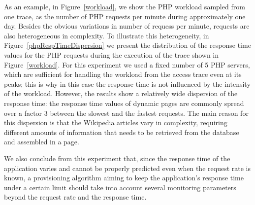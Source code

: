 As an example, in Figure~\ref{workload}, we show the PHP workload
sampled from one trace, as the number of PHP requests per minute
during approximately one day. Besides the obvious variations in number
of requess per minute, requests are also heterogeneous in complexity.
To illustrate this heterogeneity, in
Figure~\ref{phpRespTimeDispersion} we present the distribution of the
response time values for the PHP requests during the execution of the
trace shown in Figure~\ref{workload}.  For this experiment we used a
fixed number of 5 PHP servers, which are sufficient for handling the
workload from the access trace even at its peaks; this is why in this
case the response time is not influenced by the intensity of the
workload.  However, the results show a relatively wide dispersion of
the response time: the response time values of dynamic pages are
commonly spread over a factor 3 between the slowest and the fastest
requests.  The main reason for this dispersion is that the Wikipedia
articles vary in complexity, requiring different amounts of
information that needs to be retrieved from the database and assembled
in a page.


We also conclude from this experiment that, since the response time of
the application varies and cannot be properly predicted even when the
request rate is known, a provisioning algorithm aiming to keep the
application's response time under a certain limit should take into
account several monitoring parameters beyond the request rate and the
response time.







